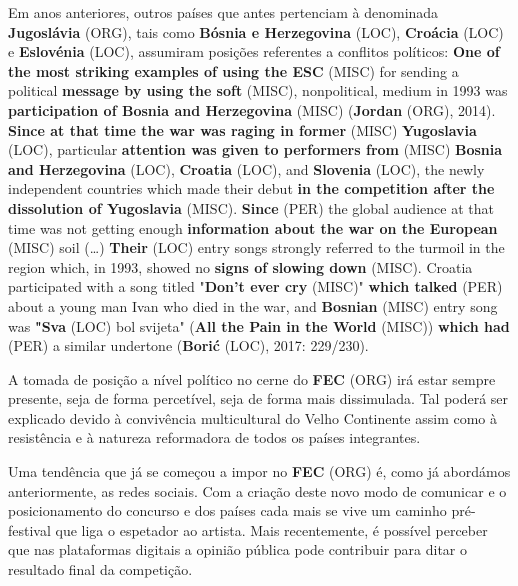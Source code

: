 \documentclass[12pt,a4paper]{article}
\begin{document}
Em anos anteriores, outros países que antes pertenciam à denominada \textbf{Jugoslávia} (ORG), tais como \textbf{Bósnia e Herzegovina} (LOC), \textbf{Croácia} (LOC) e \textbf{Eslovénia} (LOC), assumiram posições referentes a conflitos políticos: \textbf{One of the most striking examples of using the ESC} (MISC) for sending a political \textbf{message by using the soft} (MISC), nonpolitical, medium in 1993 was \textbf{participation of Bosnia and Herzegovina} (MISC) (\textbf{Jordan} (ORG), 2014). \textbf{Since at that time the war was raging in  former} (MISC) \textbf{Yugoslavia} (LOC), particular \textbf{attention was given to performers from} (MISC) \textbf{Bosnia and Herzegovina} (LOC), \textbf{Croatia} (LOC), and \textbf{Slovenia} (LOC), the  newly  independent  countries  which  made  their  debut  \textbf{in  the  competition  after  the dissolution of Yugoslavia} (MISC). \textbf{Since} (PER) the global audience at that time was not getting enough \textbf{information about the war on the European} (MISC) soil (…) \textbf{Their} (LOC) entry songs strongly referred to the turmoil in the region which, in 1993, showed no \textbf{signs of slowing down} (MISC). Croatia participated with a song titled "\textbf{Don't ever cry} (MISC)" \textbf{which talked} (PER) about a young man Ivan who died in the war, and \textbf{Bosnian} (MISC) entry song was \textbf{"Sva} (LOC) bol svijeta" (\textbf{All the Pain in the World} (MISC)) \textbf{which had} (PER) a similar undertone (\textbf{Borić} (LOC), 2017: 229/230).

A tomada de posição a nível político no cerne do \textbf{FEC} (ORG) irá estar sempre presente, seja de forma percetível, seja de forma mais dissimulada. Tal poderá ser explicado devido à convivência multicultural do Velho Continente assim como à resistência e à natureza reformadora de todos os países integrantes.

Uma  tendência  que  já  se  começou  a  impor  no  \textbf{FEC} (ORG)  é,  como  já  abordámos anteriormente,  as  redes  sociais.  Com  a  criação  deste  novo  modo  de  comunicar  e  o posicionamento do concurso e dos países cada mais se vive um caminho pré-festival que liga o espetador ao artista. Mais recentemente, é possível perceber que nas plataformas digitais  a  opinião  pública  pode  contribuir  para  ditar  o  resultado  final  da  competição.
\end{document}
